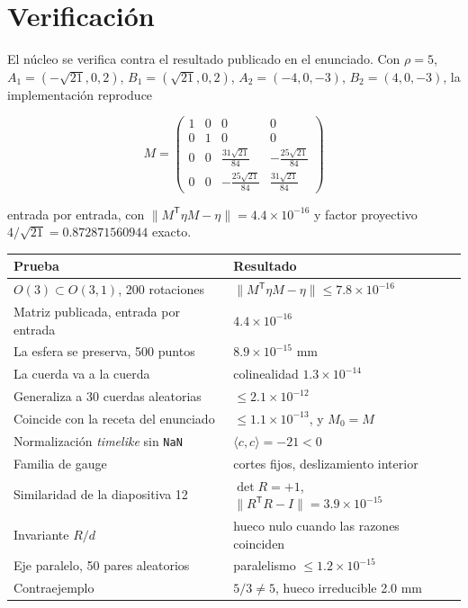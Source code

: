 \documentclass[11pt,a4paper]{article}
\newcommand{\Rd}{\ensuremath{R/d}}
\newcommand{\Ot}{\ensuremath{O(3,1)}}
\begin{document}
\section{Verificación}

El núcleo se verifica contra el resultado publicado en el enunciado. Con $\rho = 5$,
$A_1 = (-\sqrt{21},0,2)$, $B_1 = (\sqrt{21},0,2)$, $A_2 = (-4,0,-3)$, $B_2 = (4,0,-3)$, la
implementación reproduce

\[
M = \begin{pmatrix}
1 & 0 & 0 & 0\\
0 & 1 & 0 & 0\\
0 & 0 & \tfrac{31\sqrt{21}}{84} & -\tfrac{25\sqrt{21}}{84}\\[2pt]
0 & 0 & -\tfrac{25\sqrt{21}}{84} & \tfrac{31\sqrt{21}}{84}
\end{pmatrix}
\]

entrada por entrada, con $\lVert M^{\mathsf T}\eta M - \eta\rVert = 4.4\times10^{-16}$ y factor
proyectivo $4/\sqrt{21} = 0.872871560944$ exacto.

\begin{center}
\begin{tabular}{@{}p{7.6cm} p{7.6cm}@{}}
\toprule
\textbf{Prueba} & \textbf{Resultado} \\
\midrule
$O(3) \subset \Ot$, 200 rotaciones & $\lVert M^{\mathsf T}\eta M - \eta\rVert \le 7.8\times10^{-16}$ \\
Matriz publicada, entrada por entrada & $4.4\times10^{-16}$ \\
La esfera se preserva, 500 puntos & $8.9\times10^{-15}$ mm \\
La cuerda va a la cuerda & colinealidad $1.3\times10^{-14}$ \\
Generaliza a 30 cuerdas aleatorias & $\le 2.1\times10^{-12}$ \\
Coincide con la receta del enunciado & $\le 1.1\times10^{-13}$, y $M_0 = M$ \\
Normalización \emph{timelike} sin \texttt{NaN} & $\langle c,c\rangle = -21 < 0$ \\
Familia de gauge & cortes fijos, deslizamiento interior \\
Similaridad de la diapositiva 12 & $\det R = +1$, $\lVert R^{\mathsf T}R - I\rVert = 3.9\times10^{-15}$ \\
Invariante \Rd & hueco nulo cuando las razones coinciden \\
Eje paralelo, 50 pares aleatorios & paralelismo $\le 1.2\times10^{-15}$ \\
Contraejemplo & $5/3 \ne 5$, hueco irreducible 2.0 mm \\
\bottomrule
\end{tabular}
\end{center}
\end{document}
